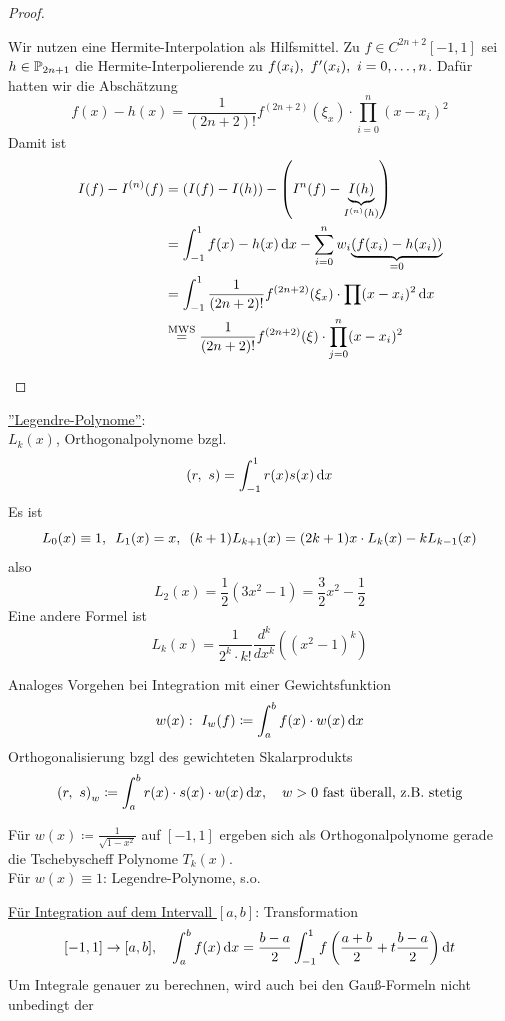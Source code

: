 \documentclass{../Skript}
\begin{document}
{\begin{proof}
\begin{description}
    Wir nutzen eine Hermite-Interpolation als Hilfsmittel. Zu $f\in C^{2n+2}[-1,1]$ sei
    $h \in \Pol{2n+1}$ die Hermite-Interpolierende zu $f(x_i), \ f'(x_i), \ \igb i 0 n$. Dafür hatten
    wir die Abschätzung\[
        f(x) - h(x) = \frac{1}{(2n+2)!} f^{(2n+2)}(\xi_x)\cdot\prod_{i=0}^n (x-x_i)^2\]
    Damit ist 
    \begin{align*}
        I(f) - I^{(n)}(f) &= \left(I(f) - I(h)\right) - \left(I^{n}(f) - \underset{I^{(n)}(h)}{\underbrace{I(h)}}\right)\\
        &= \int_{-1}^1 f(x)-h(x)\mathop{}\!\mathrm{d} x - \sum_{i=0}^n w_i\underset{=0}{\underbrace{(f(x_i) - h(x_i))}}\\
        &= \int_{-1}^1 \frac{1}{(2n+2)!}f^{(2n+2)}(\xi_x)\cdot\prod(x-x_i)^2\mathop{}\!\mathrm{d} x\\
        &\overset{\text{MWS}}{=} \frac{1}{(2n+2)!}f^{(2n+2)}(\xi)\cdot\prod_{j=0}^n(x-x_i)^2
    \end{align*}
    \end{description}
\end{proof}
\underline{''Legendre-Polynome''}:\\
    $L_k(x)$, Orthogonalpolynome bzgl. \[\left(r,\ s\right) = \int_{-1}^1 r(x)s(x)\mathop{}\!\mathrm{d} x\]
    Es ist \[
        L_0(x) \equiv 1, \hspace{.5em} L_1(x) = x, \hspace{.5em} (k+1)L_{k+1}(x) = (2k+1)x\cdot L_k(x) - kL_{k-1}(x)\]
    also \[
        L_2(x) = \frac{1}{2}(3x^2 - 1) = \frac{3}{2}x^2 - \frac{1}{2}\]
    Eine andere Formel ist \[
        L_k(x) = \frac{1}{2^k\cdot k!}\frac{d^k}{dx^k}\left((x^2-1)^k\right)\]
\begin{remark}
    Analoges Vorgehen bei Integration mit einer Gewichtsfunktion \[
        w(x): \ I_w(f) \coloneqq \int_a^b f(x)\cdot w(x)\mathop{}\!\mathrm{d} x\]
    Orthogonalisierung bzgl des gewichteten Skalarprodukts \[
        \left(r,\ s\right)_w \coloneqq \int_a^b r(x)\cdot s(x)\cdot w(x)\mathop{}\!\mathrm{d} x, \hspace{1em} w>0\text{ fast überall, z.B. stetig}\]
\end{remark}
\begin{example}
    Für $w(x) \coloneqq \frac{1}{\sqrt{1-x^2}}$ auf $[-1,1]$ ergeben sich als Orthogonalpolynome 
    gerade die Tschebyscheff Polynome $T_k(x)$.\\
    Für $w(x)\equiv 1$: Legendre-Polynome, s.o.
\end{example}
\underline{Für Integration auf dem Intervall $[a,b]$}: Transformation \[[-1,1]\to [a,b],\hspace{1em} \int_a^b f(x)\mathop{}\!\mathrm{d} x = 
\frac{b-a}{2}\int_{-1}^1 f\left(\frac{a+b}{2}+ t\frac{b-a}{2}\right)\mathop{}\!\mathrm{d} t\] 
Um Integrale genauer zu berechnen, wird auch bei den Gauß-Formeln nicht unbedingt der
}
\end{document}
